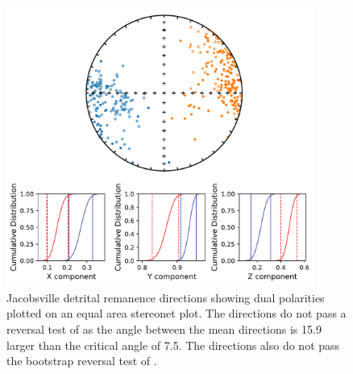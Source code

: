 \begin{figure}
\centering
\includegraphics[width=0.9\textwidth]{figure/Zhang2024a/SI_reversal_test.pdf}
\caption[Paleomagnetic reversal test of the Jacobsville detrital remanent magnetization]{Jacobsville detrital remanence directions showing dual polarities plotted on an equal area stereonet plot. The directions do not pass a reversal test of \cite{McFadden1990a} as the angle between the mean directions is 15.9\textdegree\, larger than the critical angle of 7.5\textdegree. The directions also do not pass the bootstrap reversal test of \cite{Tauxe1991a}. }
\label{fig:Jacobsville_reversal_test}
\end{figure}

